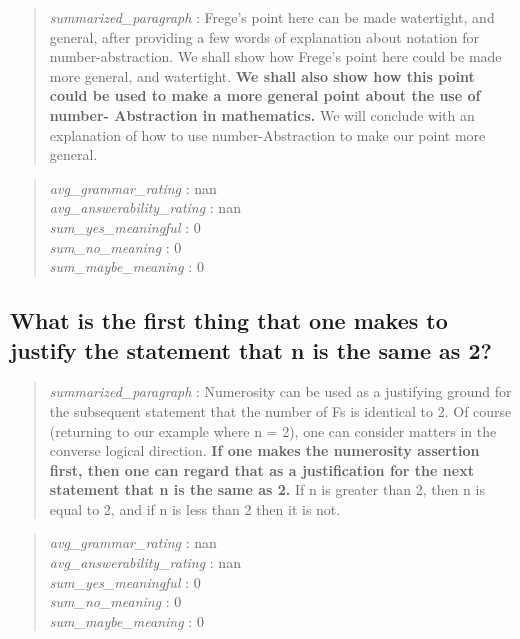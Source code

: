 \begin{quote}
\emph{summarized\_paragraph} : Frege's point here can be made
watertight, and general, after providing a few words of explanation
about notation for number-abstraction. We shall show how Frege's point
here could be made more general, and watertight. \textbf{We shall also
show how this point could be used to make a more general point about the
use of number- Abstraction in mathematics.} We will conclude with an
explanation of how to use number-Abstraction to make our point more
general.
\end{quote}

\begin{quote}
\emph{avg\_grammar\_rating} : nan\\
\emph{avg\_answerability\_rating} : nan\\
\emph{sum\_yes\_meaningful} : 0\\
\emph{sum\_no\_meaning} : 0\\
\emph{sum\_maybe\_meaning} : 0
\end{quote}

\hypertarget{what-is-the-first-thing-that-one-makes-to-justify-the-statement-that-n-is-the-same-as-2}{%
\subsection{What is the first thing that one makes to justify the
statement that n is the same as
2?}\label{what-is-the-first-thing-that-one-makes-to-justify-the-statement-that-n-is-the-same-as-2}}

\begin{quote}
\emph{summarized\_paragraph} : Numerosity can be used as a justifying
ground for the subsequent statement that the number of Fs is identical
to 2. Of course (returning to our example where n = 2), one can consider
matters in the converse logical direction. \textbf{If one makes the
numerosity assertion first, then one can regard that as a justification
for the next statement that n is the same as 2.} If n is greater than 2,
then n is equal to 2, and if n is less than 2 then it is not.
\end{quote}

\begin{quote}
\emph{avg\_grammar\_rating} : nan\\
\emph{avg\_answerability\_rating} : nan\\
\emph{sum\_yes\_meaningful} : 0\\
\emph{sum\_no\_meaning} : 0\\
\emph{sum\_maybe\_meaning} : 0
\end{quote}

